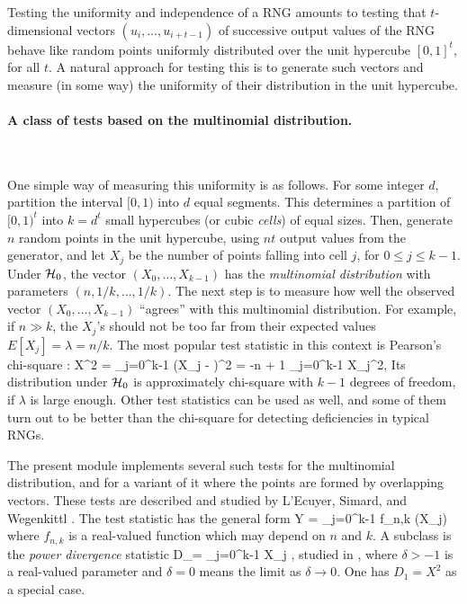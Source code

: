 
Testing the uniformity and independence of a RNG amounts to testing
that $t$-dimensional vectors $(u_i,\dots,u_{i+t-1})$ of successive
output values of the RNG behave like random points uniformly distributed
over the unit hypercube $[0,1]^t$, for all $t$.
A natural approach for testing this is to generate such vectors and measure
(in some way) the uniformity of their distribution in the unit hypercube.

\paragraph*{A class of tests based on the multinomial distribution.} \

One simple way of measuring this uniformity is as follows.
For some integer $d$, partition the interval $[0,1)$ into $d$ equal
segments.  This determines a partition of $[0,1)^t$ into $k = d^t$
small hypercubes (or cubic {\em cells\/}) of equal sizes.
Then, generate $n$ random points in the unit hypercube, using $nt$
output values from the generator, and let $X_j$ be the number of
points falling into cell $j$, for $0\le j\le k-1$.
Under $\mathcal{H}_0$, the vector $(X_0,\dots,X_{k-1})$ has the
{\em multinomial distribution\/} with parameters $(n,1/k,\dots,1/k)$.
The next step is to measure how well the observed vector
$(X_0,\dots,X_{k-1})$ ``agrees'' with this multinomial distribution.
For example, if $n \gg k$, the $X_j$'s should not be too far from
their expected values $E[X_j] = \lambda = n/k$.
The most popular test statistic in this context is Pearson's
chi-square \cite{rKNU98a,sLAW91a,tREA88a}:
\eq
  X^2 = \sum_{j=0}^{k-1} {(X_j - \lambda)^2 \over \lambda}
      = -n + {1\over\lambda} \sum_{j=0}^{k-1} X_j^2,
                                                       \label {eq:X2}
\endeq
Its distribution under $\mathcal{H}_0$ is approximately
chi-square with $k-1$ degrees of freedom, if $\lambda$ is large enough.
Other test statistics can be used as well, and some of
them turn out to be better than the chi-square for detecting
deficiencies in typical RNGs.

The present module implements several such tests for the
multinomial distribution, and for a variant of it where the points
are formed by overlapping vectors.
These tests are described and studied by
L'Ecuyer, Simard, and Wegenkittl \cite{rLEC02c}.
The test statistic has the general form
\eq
  Y = \sum_{j=0}^{k-1} f_{n,k} (X_j)                   \label{eq:Y}
\endeq
where $f_{n,k}$ is a real-valued function which may depend on $n$ and $k$.
A subclass is the {\em power divergence\/} statistic
\eq
  D_\delta = \sum_{j=0}^{k-1} {} X_j
    ,   \label{eq:Ddelta}
\endeq
studied in \cite{tREA88a},
where $\delta > -1$ is a real-valued parameter and
$\delta=0$ means the limit as $\delta\to 0$.
One has $D_1 = X^2$ as a special case.

